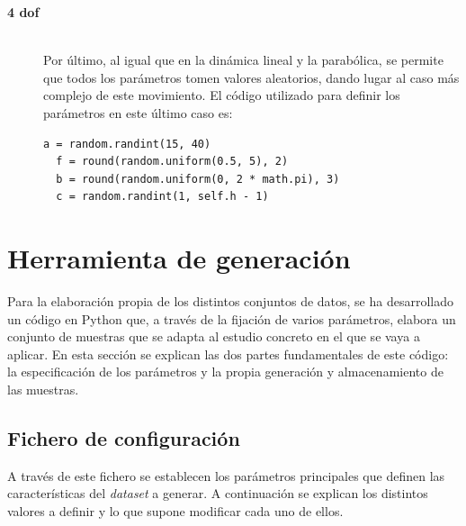 \begin{description}
\item[\textbf{4 \acrshort{dof}}] \hfill 
\vspace{10pt}
\\
Por último, al igual que en la dinámica lineal y la parabólica, se permite que todos los parámetros tomen valores aleatorios, dando lugar al caso más complejo de este movimiento. El código utilizado para definir los parámetros en este último caso es:
\vspace{10pt}
\begin{lstlisting}[frame=single]
  a = random.randint(15, 40)
  f = round(random.uniform(0.5, 5), 2)
  b = round(random.uniform(0, 2 * math.pi), 3)
  c = random.randint(1, self.h - 1)
\end{lstlisting}
\vspace{10pt}
\end{description}

\section{Herramienta de generación} \label{sec.generador}

Para la elaboración propia de los distintos conjuntos de datos,  se ha desarrollado un código en Python que, a través de la fijación de varios parámetros, elabora un conjunto de muestras que se adapta al estudio concreto en el que se vaya a aplicar. En esta sección se explican las dos partes fundamentales de este código: la especificación de los parámetros y la propia generación y almacenamiento de las muestras.

\subsection{Fichero de configuración} \label{ap.fichero}

A través de este fichero se establecen los parámetros principales que definen las características del \textit{dataset} a generar. A continuación se explican los distintos valores a definir y lo que supone modificar cada uno de ellos. 

